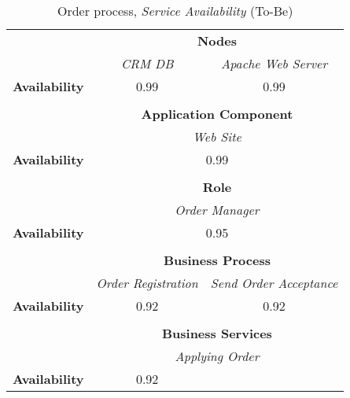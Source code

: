 \begin{table}[H]
	\centering
	\begin{tabular}{|c|c|p{2cm}|p{2.5cm}|p{2.5cm}|p{2.5cm}|}
		\cline{3-6}

		\multicolumn{2}{c}{} & \multicolumn{4}{|c|}{\textbf{Nodes}} \\ \cline{3-6}
		\multicolumn{2}{c|}{} & \multicolumn{2}{c|}{\textsl{CRM DB}} & \multicolumn{2}{c|}{\textsl{Apache Web Server}} \\
		\hline
		\multicolumn{2}{|c|}{\textbf{Availability}}  & \multicolumn{2}{c|}{0.99} & \multicolumn{2}{c|}{0.99} \\ \hline
		
		\multicolumn{6}{c}{} \\ \cline{3-6}
		\multicolumn{2}{c}{} & \multicolumn{4}{|c|}{\textbf{Application Component}} \\ \cline{3-6}
		\multicolumn{2}{c|}{} & \multicolumn{4}{c|}{\textsl{Web Site}}  \\
		\hline
		\multicolumn{2}{|c|}{\textbf{Availability}} & \multicolumn{4}{c|}{0.99}  \\ \hline
		
		\multicolumn{6}{c}{} \\ \cline{3-6}
		\multicolumn{2}{c}{} & \multicolumn{4}{|c|}{\textbf{Role}} \\ \cline{3-6}
		\multicolumn{2}{c|}{} & \multicolumn{4}{c|}{\textsl{Order Manager}} \\
		\hline
		\multicolumn{2}{|c|}{\textbf{Availability}}  & \multicolumn{4}{c|}{0.95}  \\ \hline

		\multicolumn{6}{c}{} \\ \cline{3-6}
		\multicolumn{2}{c}{} & \multicolumn{4}{|c|}{\textbf{Business Process}} \\ \cline{3-6}
		\multicolumn{2}{c|}{} & \multicolumn{2}{c|}{\textsl{Order Registration}} & \multicolumn{2}{c|}{\textsl{Send Order Acceptance}} \\
		\hline
		\multicolumn{2}{|c|}{\textbf{Availability}} & \multicolumn{2}{c|}{0.92} & \multicolumn{2}{c|}{0.92} \\ \hline

		\multicolumn{6}{c}{} \\ \cline{3-6}
		\multicolumn{2}{c}{} & \multicolumn{4}{|c|}{\textbf{Business Services}} \\ \cline{3-6}
		\multicolumn{2}{c|}{} &  \multicolumn{4}{c|}{\textsl{Applying Order}}  \\
		\hline
		\multicolumn{2}{|c|}{\textbf{Availability}}  & \multicolumn{2}{c|}{0.92}\\ \hline
	\end{tabular}
\caption{Order process, \textsl{Service Availability} (To-Be)} 
\label{tab:order_as_is}
\end{table}
